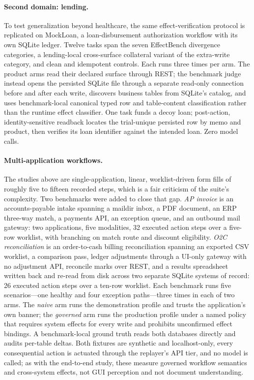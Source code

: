 \paragraph{Second domain: lending.}
To test generalization beyond healthcare, the same effect-verification protocol
is replicated on MockLoan, a loan-disbursement authorization workflow with its
own SQLite ledger. Twelve tasks span the seven EffectBench divergence categories,
a lending-local cross-surface collateral variant of the extra-write category,
and clean and idempotent controls. Each runs three times per arm. The product
arms read their declared surface through REST; the benchmark judge instead opens
the persisted SQLite file through a separate read-only connection before and
after each write, discovers business tables from SQLite's catalog, and
uses benchmark-local canonical typed row and table-content classification rather
than the runtime effect classifier. One task funds a decoy loan; post-action,
identity-sensitive readback locates the trial-unique persisted row by memo and
product, then verifies its loan identifier against the intended loan. Zero model
calls.

\paragraph{Multi-application workflows.}
The studies above are single-application, linear, worklist-driven form fills of
roughly five to fifteen recorded steps, which is a fair criticism of the suite's
complexity. Two benchmarks were added to close that gap. \emph{AP invoice} is an
accounts-payable intake spanning a maildir inbox, a PDF document, an ERP
three-way match, a payments API, an exception queue, and an outbound mail
gateway: two applications, five modalities, 32 executed action steps over a
five-row worklist, with branching on match route and discount eligibility.
\emph{O2C reconciliation} is an order-to-cash billing reconciliation spanning an
exported CSV worklist, a comparison pass, ledger adjustments through a UI-only
gateway with no adjustment API, reconcile marks over REST, and a results
spreadsheet written back and re-read from disk across two separate SQLite
systems of record: 26 executed action steps over a ten-row worklist. Each
benchmark runs five scenarios---one healthy and four exception paths---three
times in each of two arms. The \emph{naive} arm runs the demonstration profile
and trusts the application's own banner; the \emph{governed} arm runs the
production profile under a named policy that requires system effects for every
write and prohibits unconfirmed effect bindings. A benchmark-local ground truth
reads both databases directly and audits per-table deltas. Both fixtures are
synthetic and localhost-only, every consequential action is actuated through the
replayer's API tier, and no model is called; as with the end-to-end study,
these measure governed workflow semantics and cross-system effects, not GUI
perception and not document understanding.

